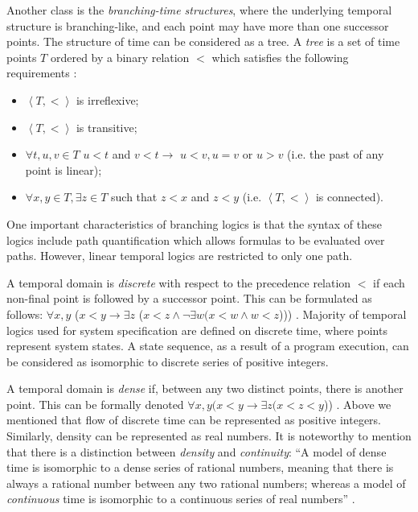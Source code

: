 \documentclass[11pt]{article}
\begin{document}
Another class is the \emph{branching-time structures}, where the underlying temporal structure is  branching-like, and each point may have more than one successor points. The structure of time can be considered as a tree. A \emph{tree} is a set of time points $T$ ordered by a binary relation $<$ which satisfies the following requirements \cite{GHR94}:

\begin{itemize}
\item \noindent $\left\langle T,<\right\rangle $ is irreflexive;
\item \noindent $\left\langle T,<\right\rangle $ is transitive;
\item \noindent $\forall t,u,v\in T$ $u<t$ and $v<t \rightarrow$
$u<v, u=v$ or $u>v$ (i.e. the past of any point is linear);
\item \noindent $\forall x,y\in T, \exists z\in T$ such that $z<x$
and $z<y$ (i.e. $\left\langle T,<\right\rangle $ is connected).
\end{itemize}

One important characteristics of branching logics is that the syntax of these logics include path quantification which allows formulas to be evaluated over paths. However, linear temporal logics are restricted to only one path.

A temporal domain is \emph{discrete} with respect to the precedence relation $<$ if each non-final point is followed by a successor point. This can be formulated as follows: $\forall x,y$ ($x<y \rightarrow \exists z$ ($x<z \wedge \neg\exists w (x<w \wedge w<z$))) \cite{Spr02}. Majority of temporal logics used for system specification are defined on discrete time, where points represent system states. A state sequence, as a result of a program execution, can be considered as isomorphic to discrete series of positive integers. 

A temporal domain is \emph{dense} if, between any two distinct points, there is another point. This can be formally denoted  $\forall x,y (x<y \rightarrow \exists z (x<z<y$)) \cite{Spr02}. Above we mentioned that flow of discrete time can be represented as positive integers. Similarly, density can be represented as real numbers. It is noteworthy to mention that there is a distinction between \emph{density} and \emph{continuity}: ``A model of dense time is isomorphic to a dense series of rational numbers, meaning that there is always a rational number between any two rational numbers; whereas a model of \emph{continuous} time is isomorphic to a continuous series of real numbers'' \cite{Ven98}.
\end{document}
